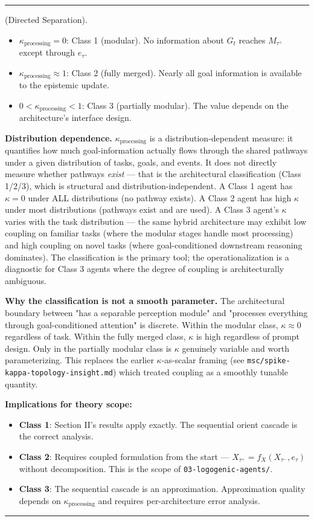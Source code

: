 \documentclass[11pt,oneside]{article}
\newcounter{claim}[section]
\renewcommand{\theclaim}{\thesection.\arabic{claim}}
\newenvironment{segment}[2]{%
  \refstepcounter{claim}%
  \bigskip\noindent\hrule\smallskip
  \noindent{\bfseries #1~\theclaim}\enskip(#2).\par\smallskip
  \noindent\ignorespaces
}{%
  \par\smallskip\noindent\hrule\bigskip
}
\newenvironment{proposition}[1][]{\begin{segment}{Proposition}{#1}}{\end{segment}}
\begin{document}
\begin{proposition}[Directed Separation]
\begin{itemize}
  \item $\kappa_{\text{processing}} = 0$: Class 1 (modular). No information about $G_t$ reaches $M_{\tau^+}$ except through $e_\tau$.
  \item $\kappa_{\text{processing}} \approx 1$: Class 2 (fully merged). Nearly all goal information is available to the epistemic update.
  \item $0 < \kappa_{\text{processing}} < 1$: Class 3 (partially modular). The value depends on the architecture's interface design.
\end{itemize}


\textbf{Distribution dependence.} $\kappa_{\text{processing}}$ is a distribution-dependent measure: it quantifies how much goal-information actually flows through the shared pathways under a given distribution of tasks, goals, and events. It does not directly measure whether pathways \textit{exist} — that is the architectural classification (Class 1/2/3), which is structural and distribution-independent. A Class 1 agent has $\kappa = 0$ under ALL distributions (no pathway exists). A Class 2 agent has high $\kappa$ under most distributions (pathways exist and are used). A Class 3 agent's $\kappa$ varies with the task distribution — the same hybrid architecture may exhibit low coupling on familiar tasks (where the modular stages handle most processing) and high coupling on novel tasks (where goal-conditioned downstream reasoning dominates). The classification is the primary tool; the operationalization is a diagnostic for Class 3 agents where the degree of coupling is architecturally ambiguous.

\textbf{Why the classification is not a smooth parameter.} The architectural boundary between "has a separable perception module" and "processes everything through goal-conditioned attention" is discrete. Within the modular class, $\kappa \approx 0$ regardless of task. Within the fully merged class, $\kappa$ is high regardless of prompt design. Only in the partially modular class is $\kappa$ genuinely variable and worth parameterizing. This replaces the earlier $\kappa$-as-scalar framing (see \texttt{msc/spike-kappa-topology-insight.md}) which treated coupling as a smoothly tunable quantity.

\textbf{Implications for theory scope:}
\begin{itemize}
  \item \textbf{Class 1}: Section II's results apply exactly. The sequential orient cascade is the correct analysis.
  \item \textbf{Class 2}: Requires coupled formulation from the start — $X_{\tau^+} = f_X(X_{\tau^-}, e_\tau)$ without decomposition. This is the scope of \texttt{03-logogenic-agents/}.
  \item \textbf{Class 3}: The sequential cascade is an approximation. Approximation quality depends on $\kappa_{\text{processing}}$ and requires per-architecture error analysis.
\end{itemize}




\end{proposition}
\end{document}
